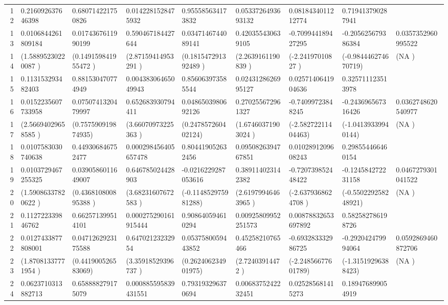\begin{table}[ht]
\begin{tabular}{rllllllll}
  12 & 0.216092637646398 & 0.680714221750826 & 0.0142281528475932 & 0.955585634173832 & 0.0533726493693132 & 0.0818434011212774 & 0.719413790287941 &  \\ 
  13 & 0.0106844261809184 & 0.0174367611990199 & 0.590467184427644 & 0.0347146744089141 & 0.420355430639105 & -0.709944189427295 & -0.205625679386384 & 0.0357352960995522 \\ 
  14 & (1.58895230220087  ) & (0.149159841955472 ) & (2.87159414953291  ) & (0.181547291392489 ) & (2.2639161190839   ) & (-2.24197010827    ) & (-0.984446274670719) & (NA                ) \\ 
  15 & 0.113153293482403 & 0.881530470774949 & 0.00438306465049943 & 0.856063973585544 & 0.0243128626995127 & 0.0257140641904636 & 0.325711123513978 &  \\ 
  16 & 0.0152235607733958 & 0.0750741320479997 & 0.652683930794411 & 0.0486503980692126 & 0.270255672961327 & -0.74099723848245 & -0.243696567316426 & 0.0362748620540977 \\ 
  17 & (2.56694029658585 ) & (0.757590919874935) & (3.66070973225363 ) & (0.247857260402124) & (1.67460371903024 ) & (-2.58272211404463) & (-1.04139339940144) & (NA               ) \\ 
  18 & 0.0107583030740638 & 0.449306846752477 & 0.000298456405657478 & 0.804419052632456 & 0.0950826394767851 & 0.0102891209608243 & 0.298554466460154 &  \\ 
  19 & 0.0103729467255325 & 0.0390586011649007 & 0.646785024428903 & -0.0216229287053616 & 0.389114023142382 & -0.720739852448422 & -0.124584272231158 & 0.0467279301041522 \\ 
  20 & (1.59086337820622  ) & (0.436810800895388 ) & (3.68231607672583  ) & (-0.114852975981288) & (2.61979946463965  ) & (-2.6379368624708  ) & (-0.550229258248921) & (NA                ) \\ 
  21 & 0.112722339846762 & 0.662571399514101 & 0.000275290161915444 & 0.908640594610294 & 0.00925809952251573 & 0.00878832653697892 & 0.582582786198726 &  \\ 
  22 & 0.0127433877808001 & 0.0471262923175588 & 0.64702123232954 & 0.0537580059443852 & 0.45258210765466 & -0.693283332986725 & -0.292042479994064 & 0.0592869460872706 \\ 
  23 & (1.87081337771954 ) & (0.441900526583069) & (3.35918529396737 ) & (0.262406234901975) & (2.72403914472    ) & (-2.24856677601789) & (-1.31519296388423) & (NA               ) \\ 
  24 & 0.0623710313882713 & 0.658888279175079 & 0.000885595839431551 & 0.793193296370694 & 0.0068375242232451 & 0.025285681415273 & 0.189476899054919 &  \\ 

\end{tabular}
\end{table}
